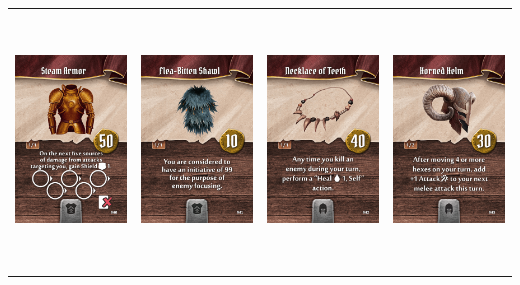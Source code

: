 \documentclass{minimal}
\begin{document}
{\begin{longtable}{llll}
\includegraphics[width=44mm,height=68mm]{./64-151/gh-104-steam-armor.png} &
\includegraphics[width=44mm,height=68mm]{./64-151/gh-105-flea-bitten-shawl.png} &
\includegraphics[width=44mm,height=68mm]{./64-151/gh-106-necklace-of-teeth.png} &
\includegraphics[width=44mm,height=68mm]{./64-151/gh-107-horned-helm.png}\\ 

\end{longtable}}
\end{document}
